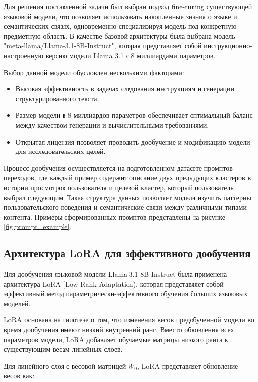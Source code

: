 Для решения поставленной задачи был выбран подход fine-tuning существующей языковой модели, что позволяет использовать накопленные знания о языке и семантических связях, одновременно специализируя модель под конкретную предметную область. В качестве базовой архитектуры была выбрана модель "meta-llama/Llama-3.1-8B-Instruct", которая представляет собой инструкционно-настроенную версию модели Llama 3.1 с 8 миллиардами параметров.

Выбор данной модели обусловлен несколькими факторами:

\begin{itemize}
    \item Высокая эффективность в задачах следования инструкциям и генерации структурированного текста.
    \item Размер модели в 8 миллиардов параметров обеспечивает оптимальный баланс между качеством генерации и вычислительными требованиями.
    \item Открытая лицензия позволяет проводить дообучение и модификацию модели для исследовательских целей.
\end{itemize}

Процесс дообучения осуществляется на подготовленном датасете промптов переходов, где каждый пример содержит описание двух предыдущих кластеров в истории просмотров пользователя и целевой кластер, который пользователь выбрал следующим. Такая структура данных позволяет модели изучить паттерны пользовательского поведения и семантические связи между различными типами контента. Примеры сформированных промптов представлены на рисунке \ref{fig:prompt_example}.

\subsection*{Архитектура LoRA для эффективного дообучения}

Для дообучения языковой модели Llama-3.1-8B-Instruct была применена архитектура LoRA (Low-Rank Adaptation), которая представляет собой эффективный метод параметрически-эффективного обучения больших языковых моделей.

LoRA основана на гипотезе о том, что изменения весов предобученной модели во время дообучения имеют низкий внутренний ранг. Вместо обновления всех параметров модели, LoRA добавляет обучаемые матрицы низкого ранга к существующим весам линейных слоев.

Для линейного слоя с весовой матрицей $W_0$, LoRA представляет обновление весов как:


